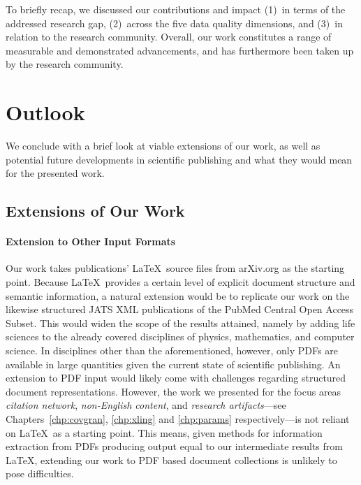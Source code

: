 To briefly recap, we discussed our contributions and impact (1)~in terms of the addressed research gap, (2)~across the five data quality dimensions, and (3)~in relation to the research community. Overall, our work constitutes a range of measurable and demonstrated advancements, and has furthermore been taken up by the research community.


\section{Outlook}

We conclude with a brief look at viable extensions of our work, as well as potential future developments in scientific publishing and what they would mean for the presented work.

\subsection{Extensions of Our Work}

\paragraph{Extension to Other Input Formats}
Our work takes publications' \LaTeX\ source files from arXiv.org as the starting point. Because \LaTeX\ provides a certain level of explicit document structure and semantic information, a natural extension would be to replicate our work on the likewise structured JATS XML publications of the PubMed Central Open Access Subset. This would widen the scope of the results attained, namely by adding life sciences to the already covered disciplines of physics, mathematics, and computer science. In disciplines other than the aforementioned, however, only PDFs are available in large quantities given the current state of scientific publishing. An extension to PDF input would likely come with challenges regarding structured document representations. However, the work we presented for the focus areas \emph{citation network}, \emph{non-English content}, and \emph{research artifacts}---see Chapters~\ref{chp:covgran}, \ref{chp:xling} and \ref{chp:params} respectively---is not reliant on \LaTeX\ as a starting point. This means, given methods for information extraction from PDFs producing output equal to our intermediate results from \LaTeX, extending our work to PDF based document collections is unlikely to pose difficulties.

